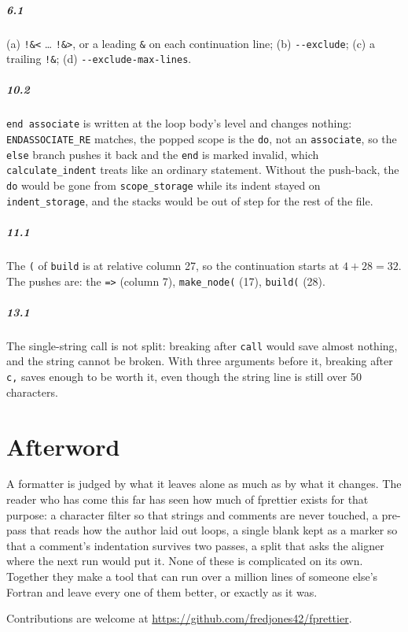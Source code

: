 \documentclass[11pt,a4paper,openany]{book}
\newcommand{\code}[1]{\texttt{\small #1}}
\newcommand{\flag}[1]{\texttt{\small -{}-#1}}
\begin{document}
\paragraph{6.1} (a) \code{!\&<} \ldots{} \code{!\&>}, or a leading \code{\&}
on each continuation line; (b) \flag{exclude}; (c) a trailing \code{!\&}; (d)
\flag{exclude-max-lines}.

\paragraph{10.2} \code{end associate} is written at the loop body's level
and changes nothing: \code{ENDASSOCIATE\_RE} matches, the popped scope is the
\code{do}, not an \code{associate}, so the \code{else} branch pushes it back
and the \code{end} is marked invalid, which \code{calculate\_indent} treats
like an ordinary statement. Without the push-back, the \code{do} would be gone
from \code{scope\_storage} while its indent stayed on \code{indent\_storage}, and
the stacks would be out of step for the rest of the file.

\paragraph{11.1} The \code{(} of \code{build} is at relative column 27, so the
continuation starts at $4 + 28 = 32$. The pushes are: the \code{=>} (column 7),
\code{make\_node(} (17), \code{build(} (28).

\paragraph{13.1} The single-string call is not split: breaking after
\code{call} would save almost nothing, and the string cannot be broken. With
three arguments before it, breaking after \code{c,} saves enough to be worth
it, even though the string line is still over 50 characters.

\backmatter
\chapter*{Afterword}

A formatter is judged by what it leaves alone as much as by what it changes. The
reader who has come this far has seen how much of fprettier exists for that
purpose: a character filter so that strings and comments are never touched,
a pre-pass that reads how the author laid out loops, a single blank kept as a
marker so that a comment's indentation survives two passes, a split that asks
the aligner where the next run would put it. None of these is complicated on
its own. Together they make a tool that can run over a million lines of
someone else's Fortran and leave every one of them better, or exactly as it
was.

Contributions are welcome at \url{https://github.com/fredjones42/fprettier}.
\end{document}
